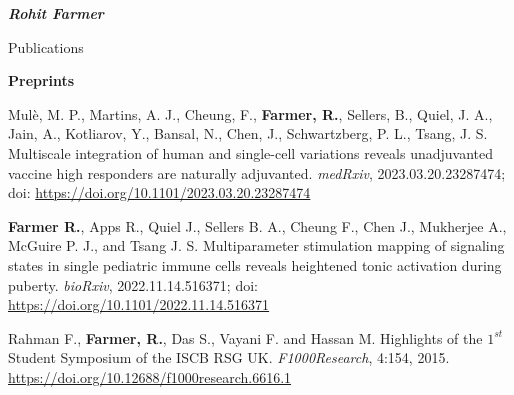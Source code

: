 \documentclass[10pt]{article}
\begin{document}
\begin{cv}{\huge \it \bfseries Rohit Farmer}
\begin{cvlist}{Publications}
\vskip3pt
\item {\textbf{Preprints}}
\begin{etaremune}
\item Mul{\`e}, M. P.,  Martins, A. J., Cheung, F., \textbf{Farmer, R.}, Sellers, B., Quiel, J. A., Jain, A., Kotliarov, Y., Bansal, N., Chen, J., Schwartzberg, P. L., Tsang, J. S. Multiscale integration of human and single-cell variations reveals unadjuvanted vaccine high responders are naturally adjuvanted. \emph{medRxiv}, 2023.03.20.23287474; doi: \url{https://doi.org/10.1101/2023.03.20.23287474}
\item \textbf{Farmer R.}, Apps R., Quiel J., Sellers B. A., Cheung F., Chen J., Mukherjee A., McGuire P. J., and Tsang J. S. Multiparameter stimulation mapping of signaling states in single pediatric immune cells reveals heightened tonic activation during puberty. \emph{bioRxiv}, 2022.11.14.516371; doi: \url{https://doi.org/10.1101/2022.11.14.516371} 
\item Rahman F., \textbf{Farmer, R.}, Das S., Vayani F. and Hassan M. Highlights of the $1^{st}$ Student Symposium of the ISCB RSG UK. \emph{F1000Research}, 4:154, 2015. \url{https://doi.org/10.12688/f1000research.6616.1} 
\end{etaremune}

\end{cvlist}
\end{cv}
\end{document}
